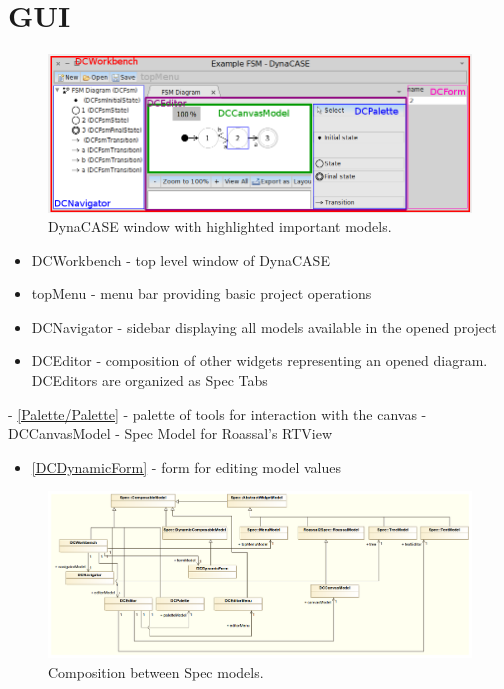 \documentclass[a4paper,10pt,twoside]{book}
\begin{document}
\fi
\sloppy

\chapter{ GUI}

\begin{figure}

\begin{center}
\includegraphics[width=1.0\textwidth]{figures/gui.png}\caption{DynaCASE window with highlighted important models.\label{figures/gui.png}}\end{center}
\end{figure}


\begin{itemize}
\item  DCWorkbench - top level window of DynaCASE
\item  topMenu - menu bar providing basic project operations
\item  DCNavigator - sidebar displaying all models available in the opened project
\item  DCEditor - composition of other widgets representing an opened diagram. DCEditors are organized as Spec Tabs
\end{itemize}

 - \ref{Palette/Palette} - palette of tools for interaction with the canvas
 - DCCanvasModel - Spec Model for Roassal's RTView

\begin{itemize}
\item  \ref{DCDynamicForm} - form for editing model values
\end{itemize}


\begin{figure}

\begin{center}
\includegraphics[width=1.0\textwidth]{figures/gui_composition.png}\caption{Composition between Spec models.\label{figures/gui_composition.png}}\end{center}
\end{figure}




\ifx\wholebook\relax\else
   
\end{document}
